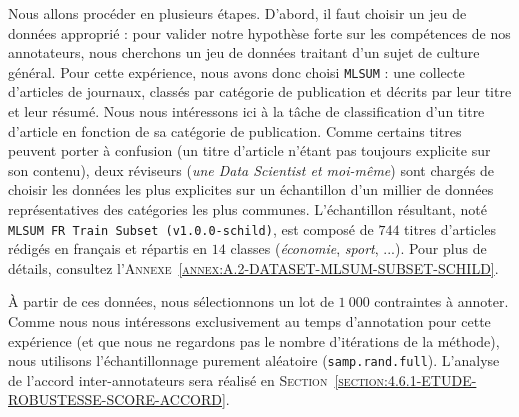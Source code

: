 			Nous allons procéder en plusieurs étapes.
			D'abord, il faut choisir un jeu de données approprié : pour valider notre hypothèse forte sur les compétences de nos annotateurs, nous cherchons un jeu de données traitant d'un sujet de culture général.
			Pour cette expérience, nous avons donc choisi \texttt{MLSUM} : une collecte d'articles de journaux, classés par catégorie de publication et décrits par leur titre et leur résumé.
			Nous nous intéressons ici à la tâche de classification d'un titre d'article en fonction de sa catégorie de publication.
			Comme certains titres peuvent porter à confusion (un titre d'article n'étant pas toujours explicite sur son contenu), deux réviseurs (\textit{une Data Scientist et moi-même}) sont chargés de choisir les données les plus explicites sur un échantillon d'un millier de données représentatives des catégories les plus communes.
			L'échantillon résultant, noté \texttt{MLSUM FR Train Subset (v1.0.0-schild)}, est composé de $744$ titres d'articles rédigés en français et répartis en $14$ classes (\textit{économie}, \textit{sport}, ...).
			Pour plus de détails, consultez l'\textsc{Annexe~\ref{annex:A.2-DATASET-MLSUM-SUBSET-SCHILD}}.
			
			À partir de ces données, nous sélectionnons un lot de $1~000$ contraintes à annoter.
			Comme nous nous intéressons exclusivement au temps d'annotation pour cette expérience (et que nous ne regardons pas le nombre d'itérations de la méthode), nous utilisons l'échantillonnage purement aléatoire (\texttt{samp.rand.full}).
			L'analyse de l'accord inter-annotateurs sera réalisé en \textsc{Section~\ref{section:4.6.1-ETUDE-ROBUSTESSE-SCORE-ACCORD}}.
			
